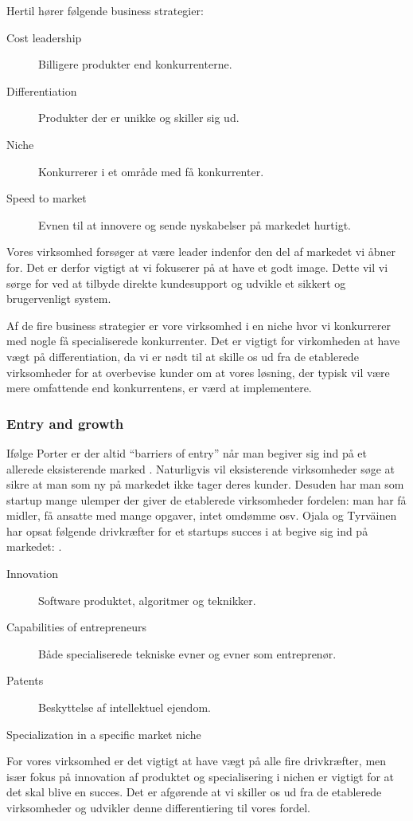 Hertil hører følgende business strategier:
\begin{description}
	\item[Cost leadership] Billigere produkter end konkurrenterne.
	\item [Differentiation] Produkter der er unikke og skiller sig ud.
	\item [Niche] Konkurrerer i et område med få konkurrenter.
	\item [Speed to market] Evnen til at innovere og sende nyskabelser på markedet hurtigt.
\end{description}

Vores virksomhed forsøger at være leader indenfor den del af markedet vi åbner for.
Det er derfor vigtigt at vi fokuserer på at have et godt image.
Dette vil vi sørge for ved at tilbyde direkte kundesupport og udvikle et sikkert og brugervenligt system.

Af de fire business strategier er vore virksomhed i en niche hvor vi konkurrerer med nogle få specialiserede konkurrenter.
Det er vigtigt for virkomheden at have vægt på differentiation, da vi er nødt til at skille os ud fra de etablerede virksomheder for at overbevise kunder om at vores løsning, der typisk vil være mere omfattende end konkurrentens, er værd at implementere.

\subsubsection{Entry and growth}
Ifølge Porter er der altid ``barriers of entry'' når man begiver sig ind på et allerede eksisterende marked \citep[p.~50]{rose2012software}.
Naturligvis vil eksisterende virksomheder søge at sikre at man som ny på markedet ikke tager deres kunder.
Desuden har man som startup mange ulemper der giver de etablerede virksomheder fordelen: man har få midler, få ansatte med mange opgaver, intet omdømme osv.
Ojala og Tyrväinen har opsat følgende drivkræfter for et startups succes i at begive sig ind på markedet: \citep[p.~50]{rose2012software}.

\begin{description}
	\item[Innovation] Software produktet, algoritmer og teknikker.
	\item [Capabilities of entrepreneurs] Både specialiserede tekniske evner og evner som entreprenør.
	\item [Patents] Beskyttelse af intellektuel ejendom.
	\item [Specialization in a specific market niche]
\end{description}

For vores virksomhed er det vigtigt at have vægt på alle fire drivkræfter, men især fokus på innovation af produktet og specialisering i nichen er vigtigt for at det skal blive en succes.
Det er afgørende at vi skiller os ud fra de etablerede virksomheder og udvikler denne differentiering til vores fordel.
